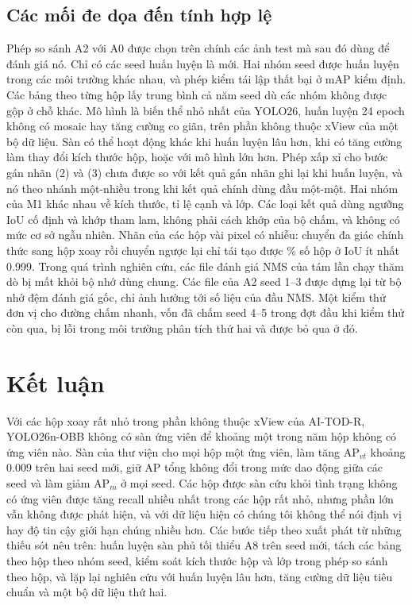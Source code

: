 \documentclass[11pt]{article}
\begin{document}
\subsection{Các mối đe dọa đến tính hợp lệ}\label{sec:threats}
Phép so sánh A2 với A0 được chọn trên chính các ảnh test mà sau đó dùng để đánh giá nó. Chỉ có các seed huấn luyện là mới. Hai nhóm
seed được huấn luyện trong các môi trường khác nhau, và phép kiểm tái lập thất bại ở mAP kiểm định. Các bảng theo từng hộp lấy trung
bình cả năm seed dù các nhóm không được gộp ở chỗ khác. Mô hình là biến thể nhỏ nhất của YOLO26, huấn luyện 24 epoch không có
mosaic hay tăng cường co giãn, trên phần không thuộc xView của một bộ dữ liệu. Sàn có thể hoạt động khác khi huấn luyện lâu hơn, khi
có tăng cường làm thay đổi kích thước hộp, hoặc với mô hình lớn hơn. Phép xấp xỉ cho bước gán nhãn (2) và (3) chưa được so với kết
quả gán nhãn ghi lại khi huấn luyện, và nó theo nhánh một-nhiều trong khi kết quả chính dùng đầu một-một. Hai nhóm của M1 khác nhau
về kích thước, tỉ lệ cạnh và lớp. Các loại kết quả dùng ngưỡng IoU cố định và khớp tham lam, không phải cách khớp của bộ chấm, và
không có mức cơ sở ngẫu nhiên. Nhãn của các hộp vài pixel có nhiễu: chuyển đa giác chính thức sang hộp xoay rồi chuyển ngược lại
chỉ tái tạo được \rtFrac\% số hộp ở IoU ít nhất 0.999. Trong quá trình nghiên cứu, các file đánh giá NMS của tám lần chạy thăm dò bị
mất khỏi bộ nhớ dùng chung. Các file của A2 seed 1--3 được dựng lại từ bộ nhớ đệm đánh giá gốc, chỉ ảnh hưởng tới số liệu của đầu NMS.
Một kiểm thử đơn vị cho đường chấm nhanh, vốn đã chấm seed 4--5 trong đợt đầu khi kiểm thử còn qua, bị lỗi trong môi trường phân
tích thứ hai và được bỏ qua ở đó.

\section{Kết luận}
Với các hộp xoay rất nhỏ trong phần không thuộc xView của AI-TOD-R, YOLO26n-OBB không có sàn ứng viên để khoảng một trong năm hộp
không có ứng viên nào. Sàn của thư viện cho mọi hộp một ứng viên, làm tăng AP$_{vt}$ khoảng 0.009 trên hai seed mới, giữ AP tổng
không đổi trong mức dao động giữa các seed và làm giảm AP$_m$ ở mọi seed. Các hộp được sàn cứu khỏi tình trạng không có ứng viên
được tăng recall nhiều nhất trong các hộp rất nhỏ, nhưng phần lớn vẫn không được phát hiện, và với dữ liệu hiện có chúng tôi
không thể nói định vị hay độ tin cậy giới hạn chúng nhiều hơn. Các bước tiếp theo xuất phát từ những thiếu sót nêu trên: huấn
luyện sàn phủ tối thiểu A8 trên seed mới, tách các bảng theo hộp theo nhóm seed, kiểm soát kích thước hộp và lớp trong phép so
sánh theo hộp, và lặp lại nghiên cứu với huấn luyện lâu hơn, tăng cường dữ liệu tiêu chuẩn và một bộ dữ liệu thứ hai.
\end{document}
